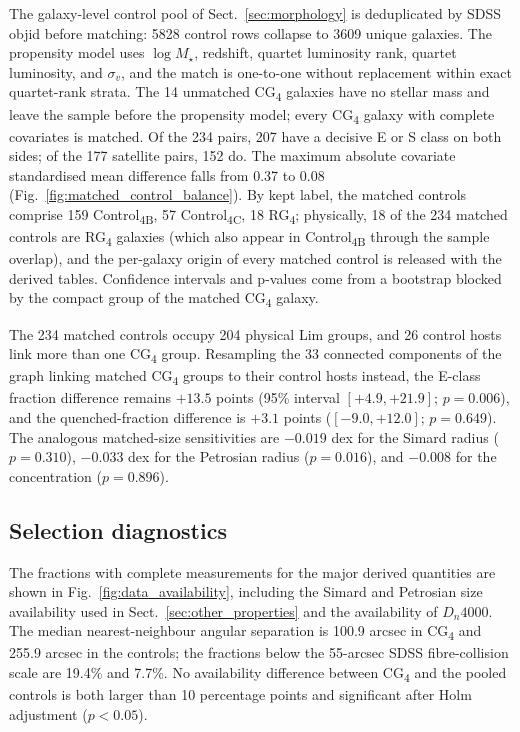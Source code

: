 \documentclass{aa}
\newcommand{\CB}{Control\textsubscript{4B}}
\newcommand{\CC}{Control\textsubscript{4C}}
\newcommand{\CG}{CG\textsubscript{4}}
\newcommand{\RG}{RG\textsubscript{4}}
\begin{document}
\begin{appendix}
The galaxy-level control pool of Sect.~\ref{sec:morphology} is deduplicated by SDSS objid before matching: 5828 control rows collapse to 3609 unique galaxies. The propensity model uses \(\log M_\star\), redshift, quartet luminosity rank, quartet luminosity, and \(\sigma_v\), and the match is one-to-one without replacement within exact quartet-rank strata. The 14 unmatched \CG{} galaxies have no stellar mass and leave the sample before the propensity model; every \CG{} galaxy with complete covariates is matched. Of the 234 pairs, 207 have a decisive E or S class on both sides; of the 177 satellite pairs, 152 do. The maximum absolute covariate standardised mean difference falls from 0.37 to 0.08 (Fig.~\ref{fig:matched_control_balance}). By kept label, the matched controls comprise 159 \CB{}, 57 \CC{}, 18 \RG{}; physically, 18 of the 234 matched controls are \RG{} galaxies (which also appear in \CB{} through the sample overlap), and the per-galaxy origin of every matched control is released with the derived tables. Confidence intervals and p-values come from a bootstrap blocked by the compact group of the matched \CG{} galaxy.











The 234 matched controls occupy 204 physical Lim groups, and 26 control hosts link more than one \CG{} group. Resampling the 33 connected components of the graph linking matched \CG{} groups to their control hosts instead, the E-class fraction difference remains \(+13.5\) points (95\% interval \([+4.9, +21.9]\); \(p = 0.006\)), and the quenched-fraction difference is \(+3.1\) points (\([-9.0, +12.0]\); \(p = 0.649\)). The analogous matched-size sensitivities are \(-0.019\) dex for the Simard radius (\(p = 0.310\)), \(-0.033\) dex for the Petrosian radius (\(p = 0.016\)), and \(-0.008\) for the concentration (\(p = 0.896\)).




\subsection{Selection diagnostics}\label{app:selection}

The fractions with complete measurements for the major derived quantities are shown in Fig.~\ref{fig:data_availability}, including the Simard and Petrosian size availability used in Sect.~\ref{sec:other_properties} and the availability of \(D_n4000\). The median nearest-neighbour angular separation is 100.9 arcsec in \CG{} and 255.9 arcsec in the controls; the fractions below the 55-arcsec SDSS fibre-collision scale are 19.4\% and 7.7\%. No availability difference between \CG{} and the pooled controls is both larger than 10 percentage points and significant after Holm adjustment (\(p<0.05\)).







\end{appendix}
\end{document}
